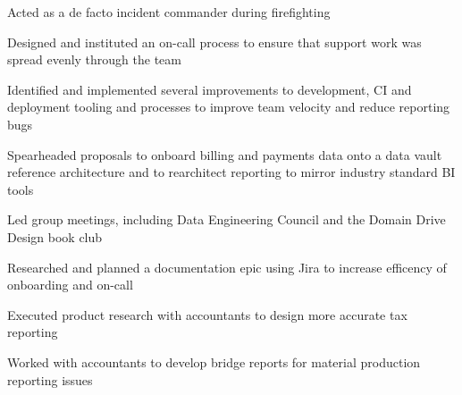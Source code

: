 \begin{job}

  \begin{accomplishments}
    \item Acted as a de facto incident commander during firefighting
    \item Designed and instituted an on-call process to ensure that
    support work was spread evenly through the team
    \item Identified and implemented several improvements to development, CI and
    deployment tooling and processes to improve team velocity and reduce
    reporting bugs
    \item Spearheaded proposals to onboard billing and payments data onto a data
    vault reference architecture and to rearchitect reporting to mirror industry
    standard BI tools
    \item Led group meetings, including Data Engineering Council and the Domain
    Drive Design book club
    \item Researched and planned a documentation epic using Jira to increase
    efficency of onboarding and on-call
    \item Executed product research with accountants to design more accurate tax
    reporting
    \item Worked with accountants to develop bridge reports for material
    production reporting issues
  \end{accomplishments}
\end{job}
